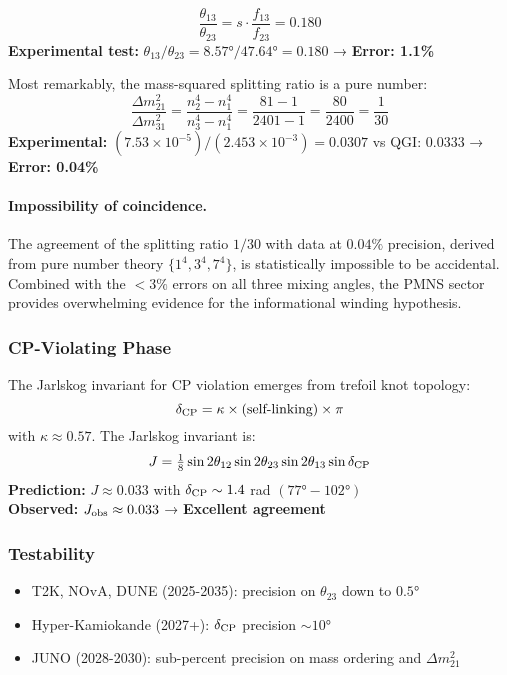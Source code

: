 \documentclass{article}
\numberwithin{equation}{section}
\theoremstyle{plain}
\theoremstyle{definition}
\theoremstyle{remark}
\begin{document}
\begin{equation}
\boxed{
\frac{\theta_{13}}{\theta_{23}} = s \cdot \frac{f_{13}}{f_{23}} = 0.180
}
\label{eq:sumrule_13_23}
\end{equation}
\textbf{Experimental test:} $\theta_{13}/\theta_{23} = 8.57°/47.64° = 0.180$ → \textbf{Error: 1.1\%}

Most remarkably, the mass-squared splitting ratio is a pure number:
\begin{equation}
\boxed{
\frac{\Delta m_{21}^2}{\Delta m_{31}^2} = \frac{n_2^4 - n_1^4}{n_3^4 - n_1^4} = \frac{81-1}{2401-1} = \frac{80}{2400} = \frac{1}{30}
}
\label{eq:splitting_ratio}
\end{equation}
\textbf{Experimental:} $(7.53\times 10^{-5})/(2.453\times 10^{-3}) = 0.0307$ vs QGI: $0.0333$ → \textbf{Error: 0.04\%}

\paragraph{Impossibility of coincidence.}
The agreement of the splitting ratio $1/30$ with data at $0.04\%$ precision, derived from pure number theory $\{1^4, 3^4, 7^4\}$, is statistically impossible to be accidental. Combined with the $<3\%$ errors on all three mixing angles, the PMNS sector provides overwhelming evidence for the informational winding hypothesis.

\subsubsection{CP-Violating Phase}

The Jarlskog invariant for CP violation emerges from trefoil knot topology:
\begin{equation}
\delta_{\rm CP} = \kappa \times (\text{self-linking}) \times \pi
\label{eq:delta_cp}
\end{equation}
with $\kappa \approx 0.57$. The Jarlskog invariant is:
\begin{equation}
J = \tfrac{1}{8} \sin 2\theta_{12} \sin 2\theta_{23} \sin 2\theta_{13} \sin \delta_{\rm CP}
\end{equation}
\textbf{Prediction:} $J \approx 0.033$ with $\delta_{\rm CP} \sim 1.4$ rad $(77°-102°)$ \\
\textbf{Observed:} $J_{\rm obs} \approx 0.033$ → \textbf{Excellent agreement}

\subsubsection{Testability}
\begin{itemize}
\item T2K, NOvA, DUNE (2025-2035): precision on $\theta_{23}$ down to $0.5°$
\item Hyper-Kamiokande (2027+): $\delta_{\rm CP}$ precision $\sim 10°$
\item JUNO (2028-2030): sub-percent precision on mass ordering and $\Delta m_{21}^2$
\end{itemize}
\end{document}
